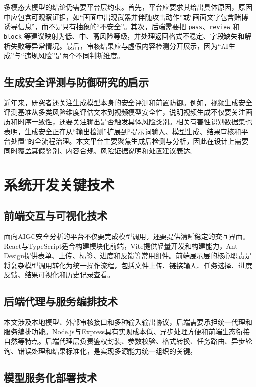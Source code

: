 多模态大模型的结论仍需要平台层约束。首先，平台应要求其给出具体原因，原因中应包含可观察证据，如“画面中出现武器并伴随攻击动作”或“画面文字包含赌博诱导信息”，而不是只有抽象的“不安全”。其次，后端需要把 \texttt{pass}、\texttt{review} 和 \texttt{block} 等建议映射为低、中、高风险等级，并处理返回格式不稳定、字段缺失和解析失败等异常情况。最后，审核结果应与虚假内容检测分开展示，因为“AI生成”与“违规风险”是两个不同判断维度。

\subsection{生成安全评测与防御研究的启示}

近年来，研究者还关注生成模型本身的安全评测和前置防御。例如，视频生成安全评测基准从多类风险维度评估文本到视频模型安全性，说明视频生成不仅要关注画质和时序一致性，还要关注输出是否触发具体风险类别\cite{ref17}。相关有害性识别数据集也表明，生成安全正在从“输出检测”扩展到“提示词输入、模型生成、结果审核和平台处置”的全流程治理\cite{ref18}。本文平台主要聚焦生成后检测与分析，因此在设计上需要同时覆盖真假鉴别、内容合规、风险证据说明和处置建议表达。

\section{系统开发关键技术}

\subsection{前端交互与可视化技术}

面向AIGC安全分析的平台不仅要完成模型调用，还要提供清晰稳定的交互界面。React与TypeScript适合构建模块化前端，Vite提供轻量开发和构建能力，Ant Design提供表单、上传、标签、进度和反馈等常用组件。前端展示层的核心职责是将复杂模型调用转化为统一操作流程，包括文件上传、链接输入、任务选择、进度反馈、结果可视化和历史记录查看。

\subsection{后端代理与服务编排技术}

本文涉及本地模型、外部审核接口和多种输入输出协议，后端需要承担统一代理和服务编排功能。Node.js与Express具有实现成本低、异步处理方便和前端生态衔接自然等特点。后端代理层负责鉴权封装、参数校验、格式转换、任务路由、异步轮询、错误处理和结果标准化，是实现多源能力统一组织的关键。

\subsection{模型服务化部署技术}


